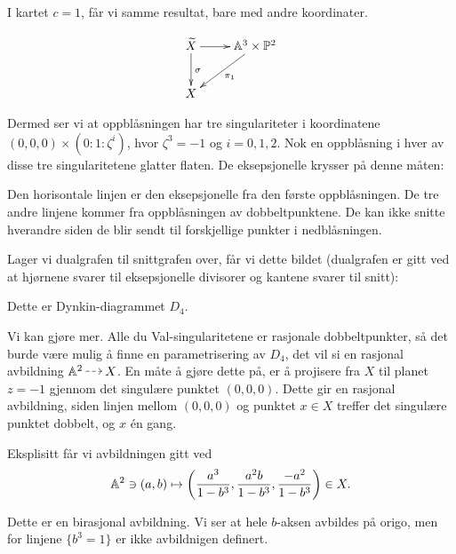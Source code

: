 \documentclass[11pt, norsk]{article}
\begin{document}
I kartet $c=1$, får vi samme resultat, bare med andre koordinater.

$$
\xymatrix{
	\widetilde X \ar[r] \ar[d]^\sigma & \Aa^3 \times \PP^2 \ar[dl]^{\pi_1} \\
	X
}
$$

Dermed ser vi at oppblåsningen har tre singulariteter i koordinatene $(0,0,0) \times (0:1:\zeta^i)$, hvor $\zeta^3=-1$ og $i=0,1,2$. Nok en oppblåsning i hver av disse tre singularitetene glatter flaten. De eksepsjonelle krysser på denne måten:

\begin{center}
\end{center}

Den horisontale linjen er den eksepsjonelle fra den første oppblåsningen. De tre andre linjene kommer fra oppblåsningen av dobbeltpunktene. De kan ikke snitte hverandre siden de blir sendt til forskjellige punkter i nedblåsningen.

Lager vi dualgrafen til snittgrafen over, får vi dette bildet (dualgrafen er gitt ved at hjørnene svarer til eksepsjonelle divisorer og kantene svarer til snitt):

\begin{center}
\end{center}

Dette er Dynkin-diagrammet $D_4$. 

Vi kan gjøre mer. Alle du Val-singularitetene er rasjonale dobbeltpunkter, så det burde være mulig å finne en parametrisering av $D_4$, det vil si en rasjonal avbildning $\Aa^2 \rmap X$. En måte å gjøre dette på, er å projisere fra $X$ til planet $z=-1$ gjennom det singulære punktet $(0,0,0)$. Dette gir en rasjonal avbildning, siden linjen mellom $(0,0,0)$ og punktet $x \in X$ treffer det singulære punktet dobbelt, og $x$ én gang.

Eksplisitt får vi avbildningen gitt ved
$$
\mathbb{A}^2 \ni (a,b) \mapsto \left( \frac{a^3}{1-b^3}, \frac{a^2b}{1-b^3}, \frac{-a^2}{1-b^3}\right) \in X.
$$

Dette er en birasjonal avbildning. Vi ser at hele $b$-aksen avbildes på origo, men for linjene $\{b^3=1\}$ er ikke avbildnigen definert.
\end{document}
